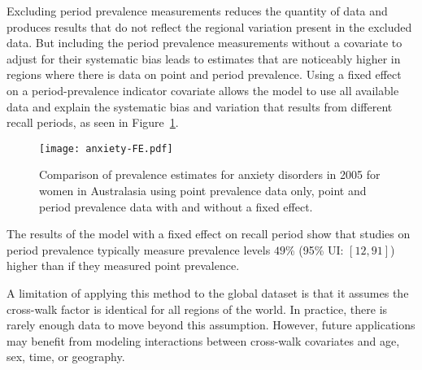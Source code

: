 Excluding period prevalence measurements reduces the quantity of data
and produces results that do not reflect the regional variation
present in the excluded data.  But including the period prevalence
measurements without a covariate to adjust for their systematic bias
leads to estimates that are noticeably higher in regions where there
is data on point and period prevalence.  Using a fixed effect on a
period-prevalence indicator covariate allows the model to use all
available data and explain the systematic bias and variation that
results from different recall periods, as seen in
Figure~\ref{fig:app-anxiety FE}.

    \begin{figure}[h]
        \begin{center}
            \texttt{[image: anxiety-FE.pdf]}
            \caption{Comparison of prevalence estimates for anxiety
              disorders in 2005 for women in Australasia using point
              prevalence data only, point and period prevalence data
              with and without a fixed effect.}
            \label{fig:app-anxiety FE}
        \end{center}
    \end{figure}

The results of the model with a fixed effect on recall period show
that studies on period prevalence typically measure prevalence levels
$49$\% (95\% UI: $[12, 91]$) higher than if they measured point
prevalence.

A limitation of applying this method to the global dataset is that it
assumes the cross-walk factor is identical for all regions of the
world.  In practice, there is rarely enough data to move beyond this
assumption.  However, future applications may benefit from modeling
interactions between cross-walk covariates and age, sex, time, or
geography.
